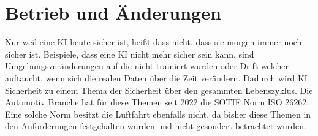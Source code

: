 \section{Betrieb und Änderungen}
Nur weil eine KI heute sicher ist, heißt dass nicht, dass sie morgen immer noch sicher ist. 
Beispiele, dass eine KI nicht mehr sicher sein kann, sind Umgebungsveränderungen auf die nicht trainiert wurden 
oder Drift welcher auftaucht, wenn sich die realen Daten über die Zeit verändern. 
Dadurch wird KI Sicherheit zu einem Thema der Sicherheit über den gesammten Lebenszyklus. 
Die Automotiv Branche hat für diese Themen seit 2022 die SOTIF Norm ISO 26262. Eine solche Norm besitzt die Luftfahrt ebenfalls nicht, 
da bisher diese Themen in den Anforderungen festgehalten wurden und nicht gesondert betrachtet wurden.